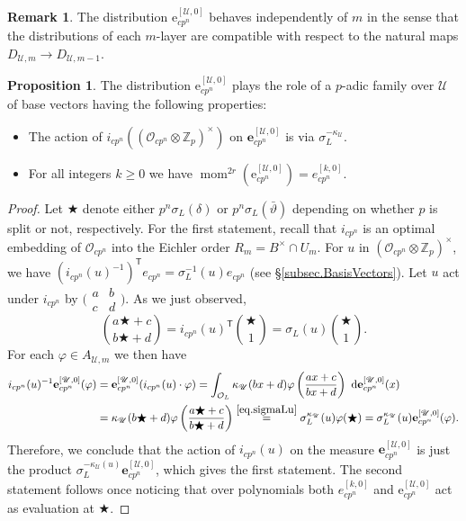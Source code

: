 \documentclass[a4paper]{amsart}
\numberwithin{equation}{section}
\theoremstyle{definition}
\newtheorem{proposition}[theorem]{Proposition}
\newtheorem{remark}[theorem]{Remark}
\newcommand{\Z}{\mathbb{Z}}
\newcommand{\smallmat}[4]{\bigl(\begin{smallmatrix}#1&#2\\#3&#4\end{smallmatrix}\bigr)}
\begin{document}
\begin{remark}
The distribution $\boldsymbol{\mathrm{e}}_{cp^n}^{[\mathscr{U},0]}$ behaves independently of $m$ in the sense that the distributions of each $m$-layer are compatible with respect to the natural maps $D_{\mathscr{U},m}\to D_{\mathscr{U},m-1}$.
\end{remark}

\begin{proposition}\label{prop.BigBaseVectors} The distribution $\boldsymbol{\mathrm{e}}_{cp^n}^{[\mathscr{U},0]}$ plays the role of a $p$-adic family over $\mathscr{U}$ of base vectors having the following properties: 
\begin{itemize}
\item The action of $i_{cp^n}\left((\mathcal{O}_{cp^n}\otimes\Z_p)^\times\right)$ on $\mathbf{e}_{cp^n}^{[\mathscr{U},0]}$ is via $\sigma_L^{-\kappa_\mathscr{U}}$. 
\item For all integers $k\geq 0$ we have 
$\operatorname{mom}^{2r}(\boldsymbol{\mathrm{e}}_{cp^n}^{[\mathscr{U},0]})=e^{[k,0]}_{cp^n}.$
\end{itemize}
\end{proposition}
\begin{proof}
Let $\bigstar$ denote either $p^n\sigma_L(\delta)$ or $p^n\sigma_L(\bar\vartheta)$ depending on whether $p$ is split or not, respectively. For the first statement, recall that $i_{cp^n}$ is an optimal embedding 
of $\mathcal{O}_{cp^n}$ into the Eichler order $R_m=B^\times\cap U_m$. For $u$ in $(\mathcal{O}_{cp^n}\otimes\Z_p)^\times$, we have
$(i_{cp^n}(u)^{-1})^\mathsf{T}e_{cp^n}=\sigma_L^{-1}(u)e_{cp^n}$ (see \S\ref{subsec.BasisVectors}). Let $u$ act under $i_{cp^n}$ by $\smallmat{a}{b}{c}{d}$. As we just observed, 
\begin{equation}\label{eq.sigmaLu}
\binom{a\bigstar + c}{b\bigstar + d}=i_{cp^n}(u)^\mathsf{T}\binom{\bigstar}{1}=\sigma_L(u)\binom{\bigstar}{1}.
\end{equation}
For each $\varphi\in A_{\mathscr{U},m}$ we then have
\begin{align*}
i_{cp^n}(u)^{-1}\mathbf{e}_{cp^n}^{[\mathscr{U},0]}(\varphi)&=\mathbf{e}_{cp^n}^{[\mathscr{U},0]}(i_{cp^n}(u)\cdot \varphi)=\int_{\mathcal{O}_L}\kappa_\mathscr{U}(bx+d)\varphi\left(\frac{ax+c}{bx+d}\right)\ \mathrm{d}\mathbf{e}_{cp^n}^{[\mathscr{U},0]}(x)\\
&=\kappa_\mathscr{U}(b\bigstar+d)\varphi\left(\dfrac{a\bigstar+c}{b\bigstar+d}\right)\stackrel{\eqref{eq.sigmaLu}}{=}\sigma_L^{\kappa_\mathscr{U}}(u)\varphi(\bigstar)=\sigma_L^{\kappa_\mathscr{U}}(u)\mathbf{e}_{cp^n}^{[\mathscr{U},0]}(\varphi).
\end{align*}
Therefore, we conclude that the action of $i_{cp^n}(u)$ on the measure $\mathbf{e}_{cp^n}^{[\mathscr{U},0]}$ is just the product  
$\sigma_L^{-\kappa_\mathscr{U}(u)}\mathbf{e}_{cp^n}^{[\mathscr{U},0]}$, which gives the first statement. The second statement follows once noticing that over polynomials both $e^{[k,0]}_{cp^n}$ and $\boldsymbol{\mathrm{e}}_{cp^n}^{[\mathscr{U},0]}$ act as evaluation at $\bigstar$.
\end{proof}
\end{document}
